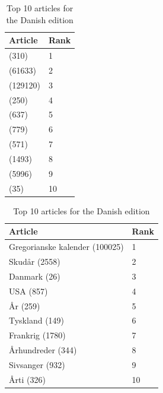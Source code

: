 \begin{table}[htbp]
    \begin{minipage}{.45\linewidth}
        \centering
        \begin{tabular}{ll}
            \toprule
            Article & Rank\\
            \midrule
            (310) & 1\\
            (61633) & 2\\
            (129120) & 3\\
            (250) & 4\\
            (637) & 5\\
            (779) & 6\\
            (571) & 7\\
            (1493) & 8\\
            (5996) & 9\\
            (35) & 10\\
            \bottomrule
        \end{tabular}
        \caption{Top 10 articles for the Arabic edition}
    \end{minipage}
    \hfill
    \begin{minipage}{.45\linewidth}
        \centering
        \begin{tabular}{ll}
            \toprule
            Article & Rank\\
            \midrule
            Gregorianske kalender (100025) & 1\\
            Skudår (2558) & 2\\
            Danmark (26) & 3\\
            USA (857) & 4\\
            År (259) & 5\\
            Tyskland (149) & 6\\
            Frankrig (1780) & 7\\
            Århundreder (344) & 8\\
            Sivsanger (932) & 9\\
            Årti (326) & 10\\
            \bottomrule
        \end{tabular}
        \caption{Top 10 articles for the Danish edition}
    \end{minipage}
\end{table}

